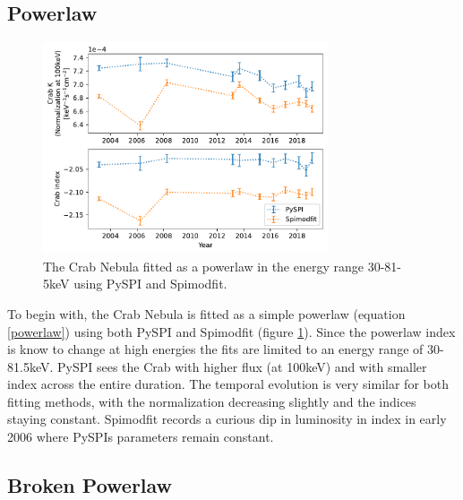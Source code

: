 \documentclass{report}
\begin{document}
\subsection{Powerlaw}
\begin{figure}[H]
  \centering
  \includegraphics[width=0.75\textwidth]{Images/Crab_Fits/crab_low_energy_pl.pdf}
  \caption{The Crab Nebula fitted as a powerlaw in the energy range 30-81-5keV using PySPI and Spimodfit.}
  \label{fig crab pl}
\end{figure}


To begin with, the Crab Nebula is fitted as a simple powerlaw (equation \ref{powerlaw}) using both PySPI and Spimodfit (figure \ref{fig crab pl}). Since the powerlaw index is know to change at high energies the fits are limited to an energy range of 30-81.5keV. PySPI sees the Crab with higher flux (at 100keV) and with smaller index across the entire duration. The temporal evolution is very similar for both fitting methods, with the normalization decreasing slightly and the indices staying constant. Spimodfit records a curious dip in luminosity in index in early 2006 where PySPIs parameters remain constant.


\FloatBarrier

\subsection{Broken Powerlaw}
\end{document}
